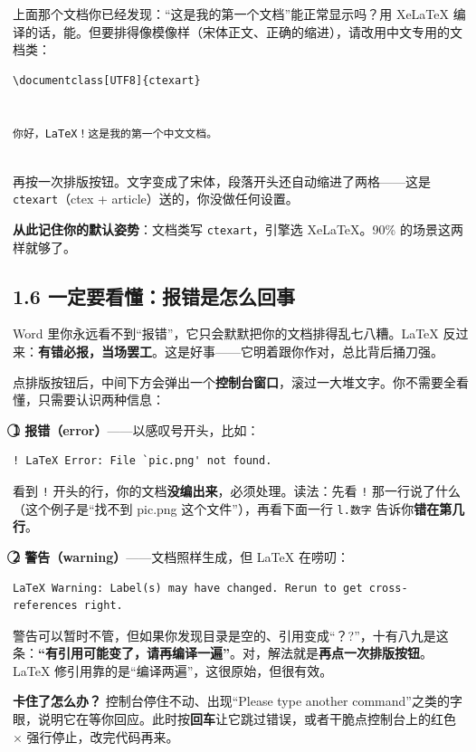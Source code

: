 上面那个文档你已经发现：“这是我的第一个文档”能正常显示吗？用 XeLaTeX 编译的话，能。但要排得像模像样（宋体正文、正确的缩进），请改用中文专用的文档类：

\begin{lstlisting}
\documentclass[UTF8]{ctexart}


你好，LaTeX！这是我的第一个中文文档。


\end{lstlisting}

再按一次排版按钮。文字变成了宋体，段落开头还自动缩进了两格——这是 \texttt{ctexart}（ctex + article）送的，你没做任何设置。

\textbf{从此记住你的默认姿势}：文档类写 \texttt{ctexart}，引擎选 XeLaTeX。90\% 的场景这两样就够了。

\subsection*{1.6 一定要看懂：报错是怎么回事}

Word 里你永远看不到“报错”，它只会默默把你的文档排得乱七八糟。LaTeX 反过来：\textbf{有错必报，当场罢工}。这是好事——它明着跟你作对，总比背后捅刀强。

点排版按钮后，中间下方会弹出一个\textbf{控制台窗口}，滚过一大堆文字。你不需要全看懂，只需要认识两种信息：

\textbf{\textcircled{\scriptsize 1} 报错（error）}——以感叹号开头，比如：

\begin{lstlisting}
! LaTeX Error: File `pic.png' not found.
\end{lstlisting}

看到 \texttt{!} 开头的行，你的文档\textbf{没编出来}，必须处理。读法：先看 \texttt{!} 那一行说了什么（这个例子是“找不到 pic.png 这个文件”），再看下面一行 \texttt{l.数字} 告诉你\textbf{错在第几行}。

\textbf{\textcircled{\scriptsize 2} 警告（warning）}——文档照样生成，但 LaTeX 在唠叨：

\begin{lstlisting}
LaTeX Warning: Label(s) may have changed. Rerun to get cross-references right.
\end{lstlisting}

警告可以暂时不管，但如果你发现目录是空的、引用变成“？?”，十有八九是这条：\textbf{“有引用可能变了，请再编译一遍”}。对，解法就是\textbf{再点一次排版按钮}。LaTeX 修引用靠的是“编译两遍”，这很原始，但很有效。

\textbf{卡住了怎么办？} 控制台停住不动、出现“Please type another command”之类的字眼，说明它在等你回应。此时按\textbf{回车}让它跳过错误，或者干脆点控制台上的红色 \ensuremath{\times} 强行停止，改完代码再来。

